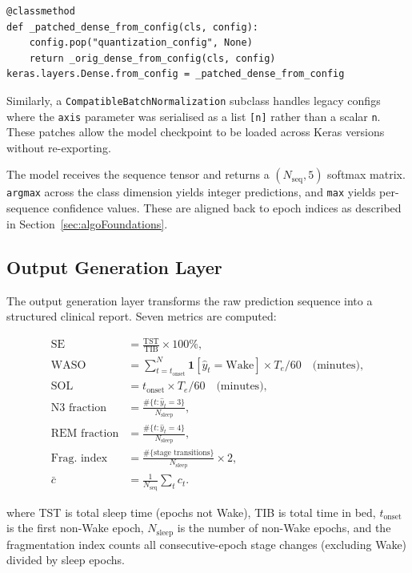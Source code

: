 \documentclass[10pt]{article}
\begin{document}
\begin{verbatim}
@classmethod
def _patched_dense_from_config(cls, config):
    config.pop("quantization_config", None)
    return _orig_dense_from_config(cls, config)
keras.layers.Dense.from_config = _patched_dense_from_config
\end{verbatim}

Similarly, a \texttt{CompatibleBatchNormalization} subclass handles legacy configs where the \texttt{axis} parameter was serialised as a list \texttt{[n]} rather than a scalar \texttt{n}. These patches allow the model checkpoint to be loaded across Keras versions without re-exporting.

The model receives the sequence tensor and returns a $(N_{\text{seq}}, 5)$ softmax matrix. \texttt{argmax} across the class dimension yields integer predictions, and \texttt{max} yields per-sequence confidence values. These are aligned back to epoch indices as described in Section~\ref{sec:algoFoundations}.

\subsection{Output Generation Layer}
\label{sec:outputLayer}

The output generation layer transforms the raw prediction sequence into a structured clinical report. Seven metrics are computed:

\begin{align}
  \text{SE} &= \frac{\text{TST}}{\text{TIB}} \times 100\%,\\
  \text{WASO} &= \sum_{t=t_{\text{onset}}}^{N} \mathbf{1}[\hat{y}_t = \text{Wake}] \times T_e / 60 \quad \text{(minutes)},\\
  \text{SOL} &= t_{\text{onset}} \times T_e / 60 \quad \text{(minutes)},\\
  \text{N3 fraction} &= \frac{\#\{t : \hat{y}_t = 3\}}{N_{\text{sleep}}},\\
  \text{REM fraction} &= \frac{\#\{t : \hat{y}_t = 4\}}{N_{\text{sleep}}},\\
  \text{Frag. index} &= \frac{\#\{\text{stage transitions}\}}{N_{\text{sleep}}} \times 2,\\
  \bar{c} &= \frac{1}{N_{\text{seq}}} \sum_{t} c_t.
\end{align}

where TST is total sleep time (epochs not Wake), TIB is total time in bed, $t_{\text{onset}}$ is the first non-Wake epoch, $N_{\text{sleep}}$ is the number of non-Wake epochs, and the fragmentation index counts all consecutive-epoch stage changes (excluding Wake) divided by sleep epochs.
\end{document}
